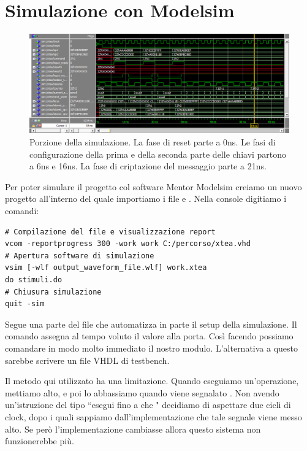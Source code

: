 \section{Simulazione con \textsf{Modelsim}}

\begin{figure}[tb]
    \centering
    \includegraphics[width=\textwidth]{vhdl_schemi/modelsim.png}
    \caption{Porzione della simulazione. La fase di reset parte a 0ns. Le fasi di configurazione della prima e della seconda parte delle chiavi partono a 6ns e 16ns. La fase di criptazione del messaggio parte a 21ns.}
    \label{fig:modelsim}
\end{figure}

Per poter simulare il progetto col software \textsf{Mentor Modelsim} creiamo un nuovo progetto all'interno del quale importiamo i file  e . Nella console digitiamo i comandi:
\begin{verbatim}
# Compilazione del file e visualizzazione report
vcom -reportprogress 300 -work work C:/percorso/xtea.vhd
# Apertura software di simulazione
vsim [-wlf output_waveform_file.wlf] work.xtea
do stimuli.do
# Chiusura simulazione
quit -sim
\end{verbatim}

Segue una parte del file  che automatizza in parte il setup della simulazione. Il comando  assegna al tempo voluto il valore alla porta. Così facendo possiamo comandare in modo molto immediato il nostro modulo. L'alternativa a questo sarebbe scrivere un file VHDL di testbench. 

Il metodo qui utilizzato ha una limitazione. Quando eseguiamo un'operazione, mettiamo  alto, e poi lo abbassiamo quando viene segnalato . Non avendo un'istruzione del tipo ``esegui fino a che " decidiamo di aspettare due cicli di clock, dopo i quali sappiamo dall'implementazione che tale segnale viene messo alto. Se però l'implementazione cambiasse allora questo sistema non funzionerebbe più.

